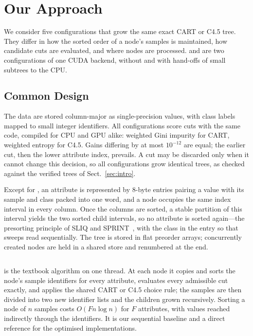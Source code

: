 \section{Our Approach}
\label{sec:impl}

We consider five configurations that grow the same exact CART or C4.5 tree. They differ in how the sorted order of a node's samples is maintained, how candidate cuts are evaluated, and where nodes are processed. \ImplGpu{} and \ImplHybrid{} are two configurations of one CUDA backend, without and with hand-offs of small subtrees to the CPU.

\subsection{Common Design}
\label{sec:impl-common}

The data are stored column-major as single-precision values, with class labels mapped to small integer identifiers. All configurations score cuts with the same code, compiled for CPU and GPU alike: weighted Gini impurity for CART, weighted entropy for C4.5. Gains differing by at most $10^{-12}$ are equal; the earlier cut, then the lower attribute index, prevails. A cut may be discarded only when it cannot change this decision, so all configurations grow identical trees, as checked against the verified trees of Sect.~\ref{sec:intro}.

Except for \ImplSerialBase{}, an attribute is represented by 8-byte entries pairing a value with its sample and class packed into one word, and a node occupies the same index interval in every column. Once the columns are sorted, a stable partition of this interval yields the two sorted child intervals, so no attribute is sorted again---the presorting principle of SLIQ and SPRINT~\cite{mehta1996sliq,shafer1996sprint}, with the class in the entry so that sweeps read sequentially. The tree is stored in flat preorder arrays; concurrently created nodes are held in a shared store and renumbered at the end.

\subsection{\ImplSerialBase}
\label{sec:impl-simple}

\ImplSerialBase{} is the textbook algorithm on one thread. At each node it copies and sorts the node's sample identifiers for every attribute, evaluates every admissible cut exactly, and applies the shared CART or C4.5 choice rule; the samples are then divided into two new identifier lists and the children grown recursively. Sorting a node of $n$ samples costs $O(F n \log n)$ for $F$ attributes, with values reached indirectly through the identifiers. It is our sequential baseline and a direct reference for the optimised implementations.

